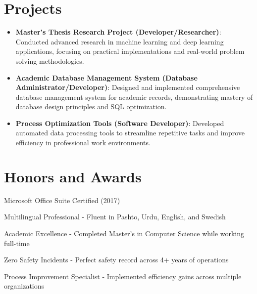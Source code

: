 \documentclass[a4paper,20pt]{article}
\newcommand{\resumeItem}[2]{
  \item\small{
    \textbf{#1}{: #2 \vspace{-2pt}}
  }
}
\newcommand{\resumeSubItem}[2]{\resumeItem{#1}{#2}\vspace{-3pt}}
\newcommand{\resumeSubHeadingListStart}{\begin{itemize}[leftmargin=*]}
\newcommand{\resumeSubHeadingListEnd}{\end{itemize}}
\begin{document}
\vspace{-5pt}
\section{Projects}
\resumeSubHeadingListStart
\resumeSubItem{Master's Thesis Research Project (Developer/Researcher)}{Conducted advanced research in machine learning and deep learning applications, focusing on practical implementations and real-world problem solving methodologies.}
\vspace{2pt}
\resumeSubItem{Academic Database Management System (Database Administrator/Developer)}{Designed and implemented comprehensive database management system for academic records, demonstrating mastery of database design principles and SQL optimization.}
\vspace{2pt}
\resumeSubItem{Process Optimization Tools (Software Developer)}{Developed automated data processing tools to streamline repetitive tasks and improve efficiency in professional work environments.}
\vspace{2pt}
\resumeSubHeadingListEnd
\vspace{-5pt}
\section{Honors and Awards}
\begin{description}[font=$\bullet$]
\item {Microsoft Office Suite Certified (2017)}
\vspace{-5pt}
\item {Multilingual Professional - Fluent in Pashto, Urdu, English, and Swedish}
\vspace{-5pt}
\item {Academic Excellence - Completed Master's in Computer Science while working full-time}
\vspace{-5pt}
\item {Zero Safety Incidents - Perfect safety record across 4+ years of operations}
\vspace{-5pt}
\item {Process Improvement Specialist - Implemented efficiency gains across multiple organizations}
\vspace{-5pt}

\end{description}
\end{document}
